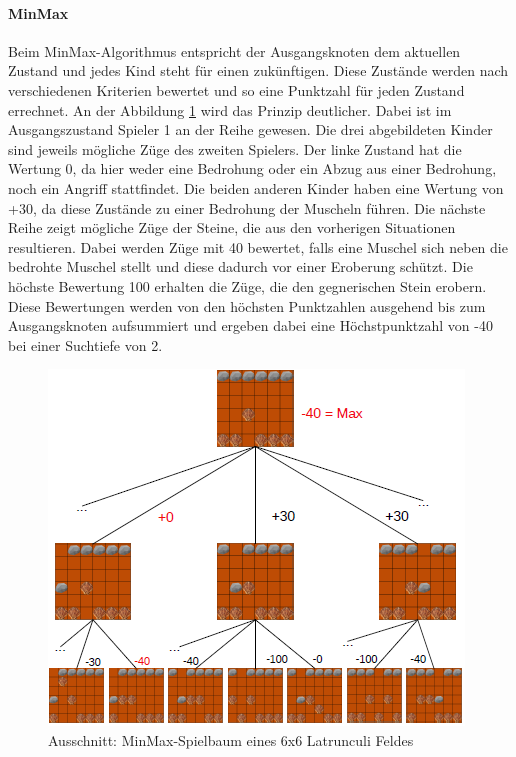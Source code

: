 \paragraph{MinMax}
Beim MinMax-Algorithmus entspricht der Ausgangsknoten dem aktuellen Zustand und jedes Kind steht für einen zukünftigen. Diese Zustände werden nach verschiedenen Kriterien bewertet und so eine Punktzahl für jeden Zustand errechnet. An der Abbildung \ref{fig:Spielbaum} wird das Prinzip deutlicher. Dabei ist im Ausgangszustand Spieler 1 an der Reihe gewesen. Die drei abgebildeten Kinder sind jeweils mögliche Züge des zweiten Spielers. Der linke Zustand hat die Wertung 0, da hier weder eine Bedrohung oder ein Abzug aus einer Bedrohung, noch ein Angriff stattfindet. Die beiden anderen Kinder haben eine Wertung von +30, da diese Zustände zu einer Bedrohung der Muscheln führen. Die nächste Reihe zeigt mögliche Züge der Steine, die aus den vorherigen Situationen resultieren. Dabei werden Züge mit 40 bewertet, falls eine Muschel sich neben die bedrohte Muschel stellt und diese dadurch vor einer Eroberung schützt. Die höchste Bewertung 100 erhalten die Züge, die den gegnerischen Stein erobern. Diese Bewertungen werden von den höchsten Punktzahlen ausgehend bis zum Ausgangsknoten aufsummiert und ergeben dabei eine Höchstpunktzahl von -40 bei einer Suchtiefe von 2. %

\begin{figure}[h]
	\centering
	\includegraphics{img/Spielbaum_latrun4}
	\caption{ Ausschnitt: MinMax-Spielbaum eines 6x6 Latrunculi Feldes}
	\label{fig:Spielbaum}
\end{figure}

